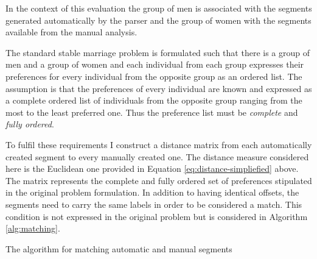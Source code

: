     In the context of this evaluation the group of men is associated with the segments generated automatically by the parser and the group of women with the segments available from the manual analysis. 

    The standard stable marriage problem is formulated such that there is a group of men and a group of women and each individual from each group expresses their preferences for every individual from the opposite group as an ordered list. The assumption is that the preferences of every individual are known and expressed as a complete ordered list of individuals from the opposite group ranging from the most to the least preferred one. Thus the preference list must be \textit{complete} and \textit{fully ordered}. 

    To fulfil these requirements I construct a distance matrix from each automatically created segment to every manually created one. The distance measure considered here is the Euclidean one provided in Equation \ref{eq:distance-simpliefied} above. The matrix represents the complete and fully ordered set of preferences stipulated in the original problem formulation. In addition to having identical offsets, the segments need to carry the same labels in order to be considered a match. This condition is not expressed in the original problem but is considered in Algorithm \ref{alg:matching}. 

    \begin{algorithm}[!ht]
        \Input{\aslist, \mslist} %
        \caption{The algorithm for matching automatic and manual segments}
        \label{alg:matching}
    \end{algorithm}

